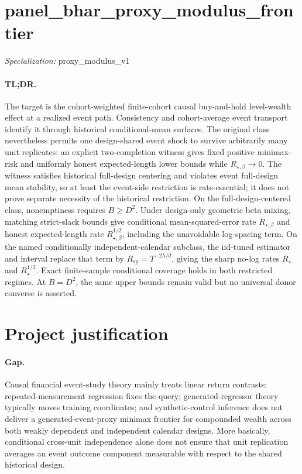 \documentclass{article}
\begin{document}
\sloppy

\section*{panel\_\allowbreak{}bhar\_\allowbreak{}proxy\_\allowbreak{}modulus\_\allowbreak{}frontier}

\noindent\textit{Specialization:} proxy\_\allowbreak{}modulus\_\allowbreak{}v1\par

\paragraph{TL;DR.} The target is the cohort-weighted finite-cohort causal buy-and-hold level-wealth effect at a realized event path.  Consistency and cohort-average event transport identify it through historical conditional-mean surfaces.  The original class nevertheless permits one design-shared event shock to survive arbitrarily many unit replicates: an explicit two-completion witness gives fixed positive minimax-risk and uniformly honest expected-length lower bounds while \(R_{\star,\beta}\to0\).  The witness satisfies historical full-design centering and violates event full-design mean stability, so at least the event-side restriction is rate-essential; it does not prove separate necessity of the historical restriction.  On the full-design-centered class, nonemptiness requires \(B\ge D^2\).  Under design-only geometric beta mixing, matching strict-slack bounds give conditional mean-squared-error rate \(R_{\star,\beta}\) and honest expected-length rate \(R_{\star,\beta}^{1/2}\), including the unavoidable log-spacing term.  On the named conditionally independent-calendar subclass, the iid-tuned estimator and interval replace that term by \(R_{\mathrm{sp}}=T^{-2\lambda/d}\), giving the sharp no-log rates \(R_\star\) and \(R_\star^{1/2}\).  Exact finite-sample conditional coverage holds in both restricted regimes.  At \(B=D^2\), the same upper bounds remain valid but no universal donor converse is asserted.

\section{Project justification}

\paragraph{Gap.} Causal financial event-study theory mainly treats linear return contrasts; repeated-measurement regression fixes the query; generated-regressor theory typically moves training coordinates; and synthetic-control inference does not deliver a generated-event-proxy minimax frontier for compounded wealth across both weakly dependent and independent calendar designs.  More basically, conditional cross-unit independence alone does not ensure that unit replication averages an event outcome component measurable with respect to the shared historical design.
\end{document}
